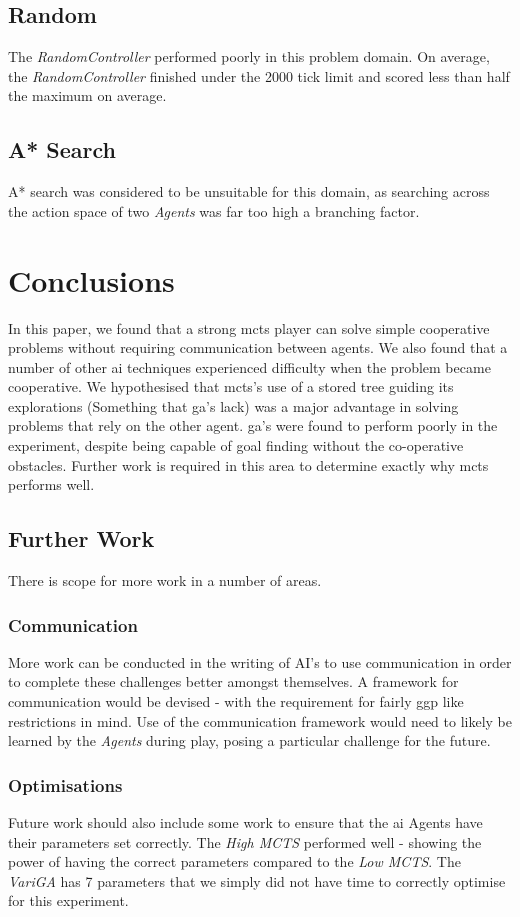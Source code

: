 \documentclass{IEEEtran}
\begin{document}
\subsection{Random}
The \emph{RandomController} performed poorly in this problem domain. On average, the \emph{RandomController} finished under the 2000 tick limit and scored less than half the maximum on average.

\subsection{A* Search}
A* search was considered to be unsuitable for this domain, as searching across the action space of two \emph{Agents} was far too high a branching factor. 
\section{Conclusions}
In this paper, we found that a strong \gls{mcts} player can solve simple cooperative problems without requiring communication between agents. We also found that a number of other \gls{ai} techniques experienced difficulty when the problem became cooperative. We hypothesised that \gls{mcts}'s use of a stored tree guiding its explorations (Something that \gls{ga}'s lack) was a major advantage in solving problems that rely on the other agent. \gls{ga}'s were found to perform poorly in the experiment, despite being capable of goal finding without the co-operative obstacles. Further work is required in this area to determine exactly why \gls{mcts} performs well.

\subsection{Further Work}
There is scope for more work in a number of areas.

\subsubsection{Communication}
More work can be conducted in the writing of AI's to use communication in order to complete these challenges better amongst themselves. A framework for communication would be devised - with the requirement for fairly \gls{ggp} like restrictions in mind. Use of the communication framework would need to likely be learned by the \emph{Agents} during play, posing a particular challenge for the future.

\subsubsection{Optimisations}
Future work should also include some work to ensure that the \gls{ai} Agents have their parameters set correctly. The \emph{High MCTS} performed well - showing the power of having the correct parameters compared to the \emph{Low MCTS}. The \emph{VariGA} has 7 parameters that we simply did not have time to correctly optimise for this experiment.
\end{document}

